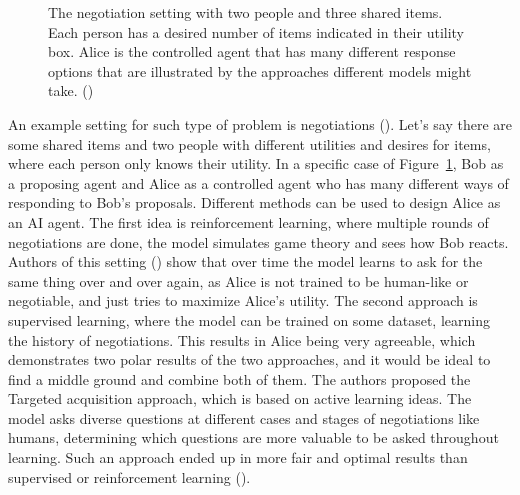 \documentclass[
  letterpaper,
  numbers=noenddot,
  DIV=11,
  oneside]{scrreprt}
\theoremstyle{remark}
\begin{document}
\begin{figure}


\caption{\label{fig-negotiation}The negotiation setting with two people
and three shared items. Each person has a desired number of items
indicated in their utility box. Alice is the controlled agent that has
many different response options that are illustrated by the approaches
different models might take. ()}

\end{figure}%

An example setting for such type of problem is negotiations
(). Let's say there are
some shared items and two people with different utilities and desires
for items, where each person only knows their utility. In a specific
case of Figure~\ref{fig-negotiation}, Bob as a proposing agent and Alice
as a controlled agent who has many different ways of responding to Bob's
proposals. Different methods can be used to design Alice as an AI agent.
The first idea is reinforcement learning, where multiple rounds of
negotiations are done, the model simulates game theory and sees how Bob
reacts. Authors of this setting () show that over time the model learns to ask for the same
thing over and over again, as Alice is not trained to be human-like or
negotiable, and just tries to maximize Alice's utility. The second
approach is supervised learning, where the model can be trained on some
dataset, learning the history of negotiations. This results in Alice
being very agreeable, which demonstrates two polar results of the two
approaches, and it would be ideal to find a middle ground and combine
both of them. The authors proposed the Targeted acquisition approach,
which is based on active learning ideas. The model asks diverse
questions at different cases and stages of negotiations like humans,
determining which questions are more valuable to be asked throughout
learning. Such an approach ended up in more fair and optimal results
than supervised or reinforcement learning
().
\end{document}

